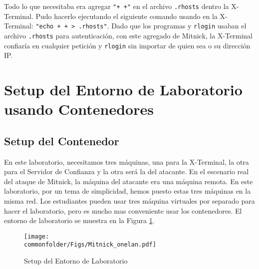 Todo lo que necesitaba era agregar \texttt{"+ +"} en el archivo \texttt{.rhosts} dentro la X-Terminal.
Pudo hacerlo ejecutando el siguiente comando usando \rsh en la X-Terminal:  {\tt "echo + + > .rhosts"}. 
Dado que los programas \rsh y \texttt{rlogin} usaban el archivo \texttt{.rhosts} para autenticación, con este agregado de Mitnick, la X-Terminal confiaría en cualquier petición \rsh y \texttt{rlogin} sin importar de quien sea o su dirección IP.


\section{Setup del Entorno de Laboratorio usando Contenedores}



\subsection{Setup del Contenedor}

En este laboratorio, necesitamos tres máquinas, una para la X-Terminal, la otra para el Servidor de Confianza y la otra será la del atacante.
En el escenario real del ataque de Mitnick, la máquina del atacante era una máquina remota.
En este laboratorio, por un tema de simplicidad, hemos puesto estas tres máquinas en la misma red.
Los estudiantes pueden usar tres máquina virtuales por separado para hacer el laboratorio, pero es mucho mas conveniente usar los contenedores. 
El entorno de laboratorio se muestra en la Figura \ref{mitnick:fig:labsetup}.


\begin{figure}[htb]
\begin{center}
\texttt{[image: \\commonfolder/Figs/Mitnick\_onelan.pdf]}
\end{center}
\caption{Setup del Entorno de Laboratorio}
\label{mitnick:fig:labsetup}
\end{figure}
 

%



